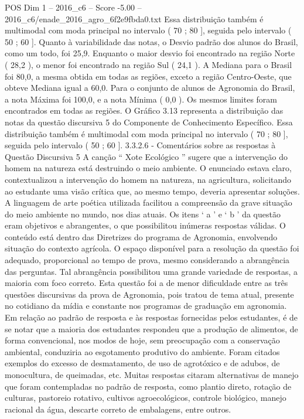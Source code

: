 \begin{textsample}{POS Dim 1 – 2016\_c6 – Score -5.00 – 2016\_c6/enade\_2016\_agro\_6f2e9fbda0.txt}
Essa distribuição também é multimodal com moda principal no intervalo ( 70 ; 80 ], seguida pelo intervalo ( 50 ; 60 ].
Quanto à variabilidade das notas, o Desvio padrão dos alunos do Brasil, como um todo, foi 25,9.
Enquanto o maior desvio foi encontrado na região Norte ( 28,2 ), o menor foi encontrado na região Sul ( 24,1 ).
A Mediana para o Brasil foi 80,0, a mesma obtida em todas as regiões, exceto a região Centro-Oeste, que obteve Mediana igual a 60,0.
Para o conjunto de alunos de Agronomia do Brasil, a nota Máxima foi 100,0, e a nota Mínima ( 0,0 ).
Os mesmos limites foram encontrados em todas as regiões.
O Gráfico 3.13 representa a distribuição das notas da questão discursiva 5 do Componente de Conhecimento Específico.
Essa distribuição também é multimodal com moda principal no intervalo ( 70 ; 80 ], seguida pelo intervalo ( 50 ; 60 ]. 3.3.2.6 - Comentários sobre as respostas à Questão Discursiva 5 A canção “ Xote Ecológico ” sugere que a intervenção do homem na natureza está destruindo o meio ambiente.
O enunciado estava claro, contextualizou a intervenção do homem na natureza, na agricultura, solicitando ao estudante uma visão crítica que, ao mesmo tempo, deveria apresentar soluções.
A linguagem de arte poética utilizada facilitou a compreensão da grave situação do meio ambiente no mundo, nos dias atuais.
Os itens ‘ a ’ e ‘ b ’ da questão eram objetivos e abrangentes, o que possibilitou inúmeras respostas válidas.
O conteúdo está dentro das Diretrizes do programa de Agronomia, envolvendo situação do contexto agrícola.
O espaço disponível para a resolução da questão foi adequado, proporcional ao tempo de prova, mesmo considerando a abrangência das perguntas.
Tal abrangência possibilitou uma grande variedade de respostas, a maioria com foco correto.
Esta questão foi a de menor dificuldade entre as três questões discursivas da prova de Agronomia, pois tratou de tema atual, presente no cotidiano da mídia e constante nos programas de graduação em agronomia.
Em relação ao padrão de resposta e às respostas fornecidas pelos estudantes, é de se notar que a maioria dos estudantes respondeu que a produção de alimentos, de forma convencional, nos modos de hoje, sem preocupação com a conservação ambiental, conduziria ao esgotamento produtivo do ambiente.
Foram citados exemplos do excesso de desmatamento, de uso de agrotóxico e de adubos, de monocultura, de queimadas, etc.
Muitas respostas citaram alternativas de manejo que foram contempladas no padrão de resposta, como plantio direto, rotação de culturas, pastoreio rotativo, cultivos agroecológicos, controle biológico, manejo racional da água, descarte correto de embalagens, entre outros.

\end{textsample}
